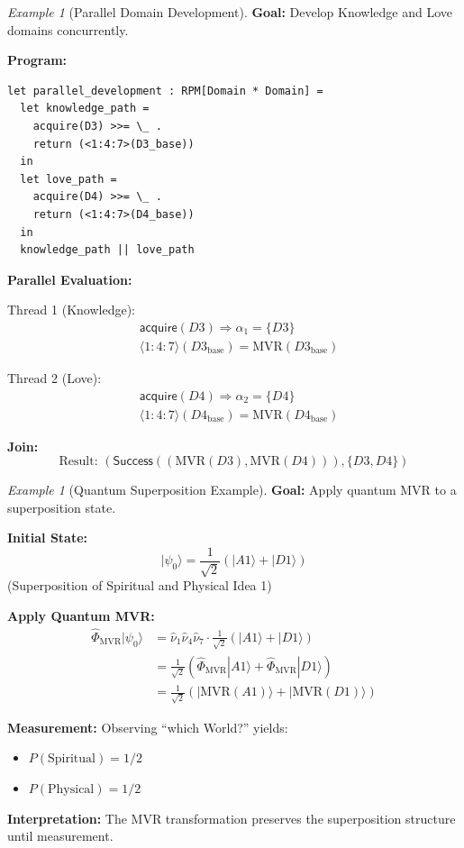 \documentclass[11pt,twoside,openright]{book}
\theoremstyle{definition}
\theoremstyle{plain}
\theoremstyle{remark}
\newtheorem{example}[definition]{Example}
\newcommand{\Frac}{\Phi}
\newcommand{\qket}[1]{|#1\rangle}
\newcommand{\qop}[1]{\hat{#1}}
\begin{document}
\begin{example}[Parallel Domain Development]
\label{ex:parallel-dev}
\textbf{Goal:} Develop Knowledge and Love domains concurrently.

\textbf{Program:}
\begin{verbatim}
let parallel_development : RPM[Domain * Domain] =
  let knowledge_path =
    acquire(D3) >>= \_ .
    return (<1:4:7>(D3_base))
  in
  let love_path =
    acquire(D4) >>= \_ .
    return (<1:4:7>(D4_base))
  in
  knowledge_path || love_path
\end{verbatim}

\textbf{Parallel Evaluation:}

Thread 1 (Knowledge):
\begin{align}
&\mathsf{acquire}(D3) \Rightarrow \alpha_1 = \{D3\} \\
&\langle 1:4:7 \rangle(D3_{\text{base}}) = \text{MVR}(D3_{\text{base}})
\end{align}

Thread 2 (Love):
\begin{align}
&\mathsf{acquire}(D4) \Rightarrow \alpha_2 = \{D4\} \\
&\langle 1:4:7 \rangle(D4_{\text{base}}) = \text{MVR}(D4_{\text{base}})
\end{align}

\textbf{Join:}
\[
\text{Result: } (\mathsf{Success}((\text{MVR}(D3), \text{MVR}(D4))), \{D3, D4\})
\]
\end{example}

\begin{example}[Quantum Superposition Example]
\label{ex:quantum-super}
\textbf{Goal:} Apply quantum MVR to a superposition state.

\textbf{Initial State:}
\[
\qket{\psi_0} = \frac{1}{\sqrt{2}}(\qket{A1} + \qket{D1})
\]
(Superposition of Spiritual and Physical Idea 1)

\textbf{Apply Quantum MVR:}
\begin{align}
\qop{\Frac}_{\text{MVR}} \qket{\psi_0} &= \qop{\nu}_1 \qop{\nu}_4 \qop{\nu}_7 \cdot \frac{1}{\sqrt{2}}(\qket{A1} + \qket{D1}) \\
&= \frac{1}{\sqrt{2}}(\qop{\Frac}_{\text{MVR}}\qket{A1} + \qop{\Frac}_{\text{MVR}}\qket{D1}) \\
&= \frac{1}{\sqrt{2}}(\qket{\text{MVR}(A1)} + \qket{\text{MVR}(D1)})
\end{align}

\textbf{Measurement:}
Observing ``which World?'' yields:
\begin{itemize}
  \item $P(\text{Spiritual}) = 1/2$
  \item $P(\text{Physical}) = 1/2$
\end{itemize}

\textbf{Interpretation:} The MVR transformation preserves the superposition structure until measurement.
\end{example}
\end{document}
